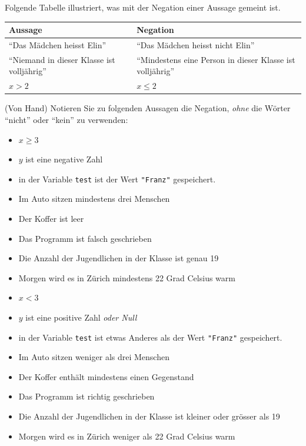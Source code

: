 \begin{myexample} Folgende Tabelle illustriert, was mit der Negation einer Aussage gemeint ist.
\begin{table}[H]
	\centering
	\begin{tabular}{p{7cm}|p{7cm}}
		\textbf{Aussage}                                  & \textbf{Negation}                                                \\\midrule\midrule
		\enquote{Das Mädchen heisst Elin}                 & \enquote{Das Mädchen heisst nicht Elin}                          \\\midrule
		\enquote{Niemand in dieser Klasse ist volljährig} & \enquote{Mindestens eine Person in dieser Klasse ist volljährig} \\\midrule
		$x > 2$                                           & $x \leq 2$
	\end{tabular}
\end{table}
\end{myexample}
\begin{myexercise}
	(Von Hand) Notieren Sie zu folgenden Aussagen die Negation, \textit{ohne} die Wörter \enquote{nicht} oder \enquote{kein} zu verwenden:
	\begin{itemize}
		\item $x \geq 3$
		\item $y$ ist eine negative Zahl
		\item in der Variable \lstinline|test| ist der Wert \lstinline|"Franz"| gespeichert.
		\item Im Auto sitzen mindestens drei Menschen
		\item Der Koffer ist leer
		\item Das Programm ist falsch geschrieben
		\item Die Anzahl der Jugendlichen in der Klasse ist genau 19
		\item Morgen wird es in Zürich mindestens 22 Grad Celsius warm
	\end{itemize}
	\begin{myanswer}
		\begin{itemize}
			\item $x < 3$
			\item $y$ ist eine positive Zahl \textit{oder Null}
			\item in der Variable \lstinline|test| ist etwas Anderes als der Wert \lstinline|"Franz"| gespeichert.
			\item Im Auto sitzen weniger als drei Menschen
			\item Der Koffer enthält mindestens einen Gegenstand
			\item Das Programm ist richtig geschrieben
			\item Die Anzahl der Jugendlichen in der Klasse ist kleiner oder grösser als 19
			\item Morgen wird es in Zürich weniger als 22 Grad Celsius warm
		\end{itemize}
	\end{myanswer}
\end{myexercise}
